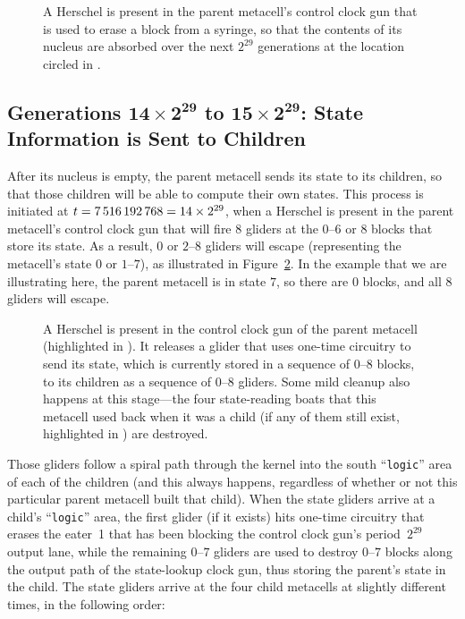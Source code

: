 \begin{figure}[!htb]
	\centering
	\caption{A Herschel is present in the parent metacell's control clock gun that is used to erase a block from a syringe, so that the contents of its nucleus are absorbed over the next $2^{29}$ generations at the location circled in .}
	\label{fig:0e0p_timeline_6979321856}
\end{figure}


\subsection{Generations $\mathbf{14 \times 2^{29}}$ to $\mathbf{15 \times 2^{29}}$: State Information is Sent to Children}\label{sec:0e0p_timeline_state}

After its nucleus is empty, the parent metacell sends its state to its children, so that those children will be able to compute their own states. This process is initiated at $t = 7{\,}516{\,}192{\,}768 = 14 \times 2^{29}$, when a Herschel is present in the parent metacell's control clock gun that will fire $8$ gliders at the $0$--$6$ or $8$ blocks that store its state. As a result, $0$ or $2$--$8$ gliders will escape (representing the metacell's state $0$ or $1$--$7$), as illustrated in Figure~\ref{fig:0e0p_timeline_7516192768}. In the example that we are illustrating here, the parent metacell is in state $7$, so there are $0$ blocks, and all $8$ gliders will escape.

\begin{figure}[!htb]
	\centering
	\caption{A Herschel is present in the control clock gun of the parent metacell (highlighted in ). It releases a glider that uses one-time circuitry to send its state, which is currently stored in a sequence of $0$--$8$ blocks, to its children as a sequence of $0$--$8$ gliders. Some mild cleanup also happens at this stage---the four state-reading boats that this metacell used back when it was a child (if any of them still exist, highlighted in ) are destroyed.}
	\label{fig:0e0p_timeline_7516192768}
\end{figure}

Those gliders follow a spiral path through the kernel into the south ``\texttt{logic}'' area of each of the children (and this always happens, regardless of whether or not this particular parent metacell built that child). When the state gliders arrive at a child's ``\texttt{logic}'' area, the first glider (if it exists) hits one-time circuitry that erases the eater~1 that has been blocking the control clock gun's period~$2^{29}$ output lane, while the remaining $0$--$7$ gliders are used to destroy $0$--$7$ blocks along the output path of the state-lookup clock gun, thus storing the parent's state in the child. The state gliders arrive at the four child metacells at slightly different times, in the following order:\smallskip

